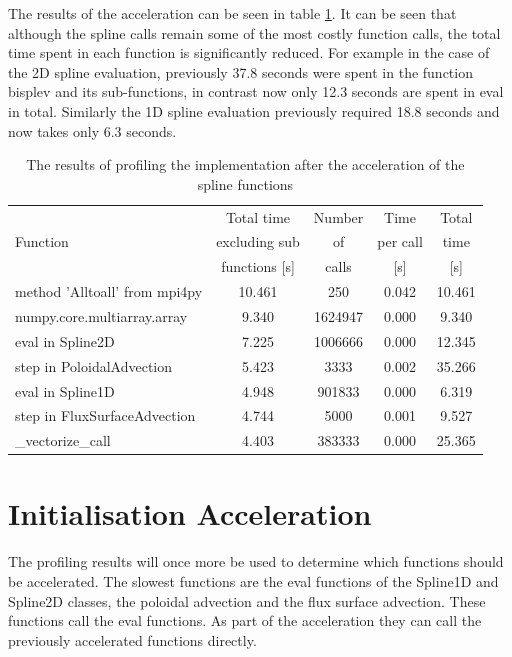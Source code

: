 The results of the acceleration can be seen in table \ref{tab::spline profile}. It can be seen that although the spline calls remain some of the most costly function calls, the total time spent in each function is significantly reduced. For example in the case of the 2D spline evaluation, previously 37.8 seconds were spent in the function bisplev and its sub-functions, in contrast now only 12.3 seconds are spent in eval in total. Similarly the 1D spline evaluation previously required 18.8 seconds and now takes only 6.3 seconds.

\begin{table}[ht]
\centering
 \begin{tabular}{|m{}|c|c|c|c|}
  \hline
          & Total time & Number & Time & Total \\
  Function & excluding sub & of & per call & time \\
          & functions [s] & calls & [s] & [s] \\
  \hline
  \hline
  method 'Alltoall' from mpi4py & 10.461 & 250 & 0.042 & 10.461 \\
  \hline
  numpy.core.multiarray.array & 9.340 & 1624947 & 0.000 & 9.340 \\
  \hline
  eval in Spline2D & 7.225 & 1006666 & 0.000 & 12.345\\
  \hline
  step in PoloidalAdvection & 5.423 & 3333 & 0.002 & 35.266\\
  \hline
  eval in Spline1D & 4.948 & 901833 & 0.000 & 6.319\\
  \hline
  step in FluxSurfaceAdvection & 4.744 & 5000 & 0.001 & 9.527\\
  \hline
  \_vectorize\_call & 4.403 & 383333 & 0.000 & 25.365\\
  \hline
 \end{tabular}
 \caption{\label{tab::spline profile} The results of profiling the implementation after the acceleration of the spline functions}
\end{table}

\section{Initialisation Acceleration}

The profiling results will once more be used to determine which functions should be accelerated. The slowest functions are the eval functions of the Spline1D and Spline2D classes, the poloidal advection and the flux surface advection. These functions call the eval functions. As part of the acceleration they can call the previously accelerated functions directly.

